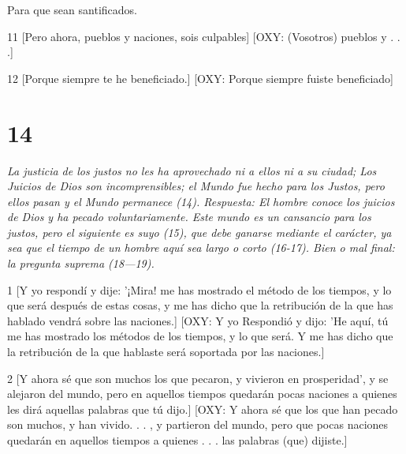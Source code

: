 \par Para que sean santificados.

\par 11 [Pero ahora, pueblos y naciones, sois culpables] [OXY: (Vosotros) pueblos y . . .]

\par [Porque siempre habéis hollado la tierra,] [OXY: (Vosotros) habéis hollado la tierra]

\par [Y usó la creación injustamente.] [OXY: Y usó mal las cosas creadas en ella.]

\par 12 [Porque siempre te he beneficiado.] [OXY: Porque siempre fuiste beneficiado]

\par [Y siempre has sido desagradecido por la beneficencia.] [OXY: Pero siempre fuiste desagradecido.]

\chapter{14}

\par \textit{La justicia de los justos no les ha aprovechado ni a ellos ni a su ciudad; Los Juicios de Dios son incomprensibles; el Mundo fue hecho para los Justos, pero ellos pasan y el Mundo permanece (14). Respuesta: El hombre conoce los juicios de Dios y ha pecado voluntariamente. Este mundo es un cansancio para los justos, pero el siguiente es suyo (15), que debe ganarse mediante el carácter, ya sea que el tiempo de un hombre aquí sea largo o corto (16-17). Bien o mal final: la pregunta suprema (18—19).}

\par 1 [Y yo respondí y dije: '¡Mira! me has mostrado el método de los tiempos, y lo que será después de estas cosas, y me has dicho que la retribución de la que has hablado vendrá sobre las naciones.] [OXY: Y yo Respondió y dijo: 'He aquí, tú me has mostrado los métodos de los tiempos, y lo que será. Y me has dicho que la retribución de la que hablaste será soportada por las naciones.]

\par 2 [Y ahora sé que son muchos los que pecaron, y vivieron en prosperidad', y se alejaron del mundo, pero en aquellos tiempos quedarán pocas naciones a quienes les dirá aquellas palabras que tú dijo.] [OXY: Y ahora sé que los que han pecado son muchos, y han vivido. . . , y partieron del mundo, pero que pocas naciones quedarán en aquellos tiempos a quienes . . . las palabras (que) dijiste.]

